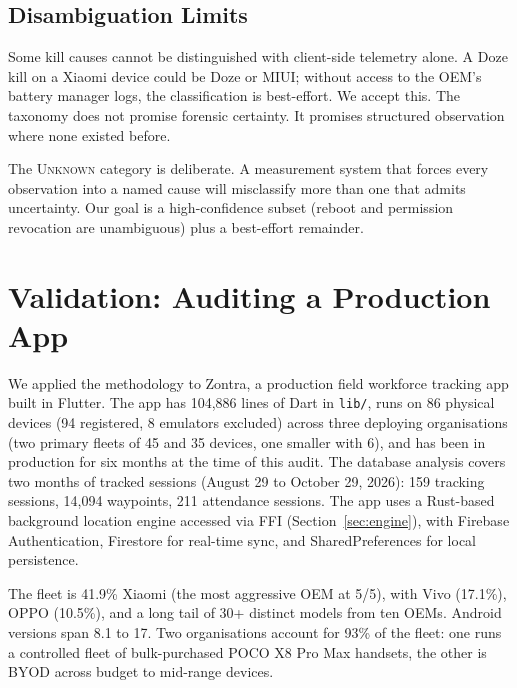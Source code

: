 \documentclass[10pt,journal,compsoc]{IEEEtran}
\begin{document}
\subsection{Disambiguation Limits}

Some kill causes cannot be distinguished with client-side telemetry
alone. A Doze kill on a Xiaomi device could be Doze or MIUI; without
access to the OEM's battery manager logs, the classification is
best-effort. We accept this. The taxonomy does not promise forensic
certainty. It promises structured observation where none existed before.

The \textsc{Unknown} category is deliberate. A measurement system that
forces every observation into a named cause will misclassify more than
one that admits uncertainty. Our goal is a high-confidence subset (reboot
and permission revocation are unambiguous) plus a best-effort remainder.


\section{Validation: Auditing a Production App}
\label{sec:validation}

We applied the methodology to Zontra, a production field workforce
tracking app built in Flutter. The app has 104,886 lines of Dart in
\texttt{lib/}, runs on 86 physical devices (94 registered, 8 emulators
excluded) across three deploying organisations (two primary fleets of 45
and 35 devices, one smaller with 6), and has been in
production for six months at the time of this audit. The database
analysis covers two months of tracked sessions (August 29 to October 29,
2026): 159 tracking sessions, 14,094 waypoints, 211 attendance sessions.
The app uses a Rust-based background location engine accessed via FFI
(Section~\ref{sec:engine}), with Firebase Authentication, Firestore for
real-time sync, and SharedPreferences for local persistence.

The fleet is 41.9\% Xiaomi (the most aggressive OEM at 5/5), with Vivo
(17.1\%), OPPO (10.5\%), and a long tail of 30+ distinct models from
ten OEMs. Android versions span 8.1 to 17. Two organisations account for
93\% of the fleet: one runs a controlled fleet of bulk-purchased POCO X8
Pro Max handsets, the other is BYOD across budget to mid-range devices.
\end{document}
